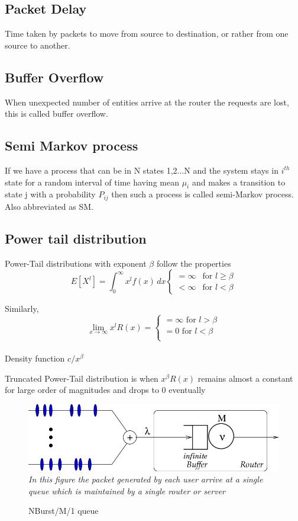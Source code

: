 \subsection{Packet Delay}
Time taken by packets to move from source to destination, or rather from one source to another.

\subsection{Buffer Overflow}
When unexpected number of entities arrive at the router the requests are lost, this is called buffer overflow.

\subsection{Semi Markov process}
If we have a process that can be in N states 1,2...N and the system stays in $i^{th}$ state for a random interval of time having mean $\mu_{i}$ and makes a transition to state j with a probability $P_{ij}$ then such a process is called semi-Markov process. Also abbreviated as SM. 

\subsection{Power tail distribution}
Power-Tail distributions with exponent $\beta$ follow the properties
\[
E[X^{l}]= \int_{0}^{\infty} x^{l} f(x) \,dx \begin{cases}
=\infty &\text{for $l\geq \beta$}\\
<\infty &\text{for $l<\beta$}
\end{cases}
\]

Similarly,
\[ 
\lim_{x\to\infty} x^{l}R(x) = \begin{cases}
=\infty \text{ for $l>\beta$}\\
=0 \text{ for $l<\beta$}\\
\end{cases}
\]
\\Density function $c/x^{\beta}$ 

Truncated Power-Tail distribution is when $x^{\beta}R(x)$ remains almost a constant for large order of magnitudes and drops to 0 eventually\\
\begin{figure}[ht!]
        \centering
        \includegraphics[scale=0.50]{NBurst.png}
        \emph{In this figure the packet generated by each user arrive at a single queue which is maintained by a single router or server }
        \caption{NBurst/M/1 queue}
\end{figure}


